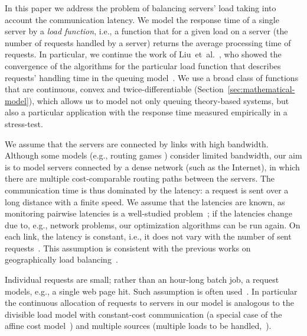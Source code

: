 \documentclass[11pt]{article}
\begin{document}
In this paper we address the problem of balancing servers' load taking into account the communication latency. 
We model the response time of a single server by a \emph{load function}, i.e., a function that for a given load on a server (the number of requests handled by a server) returns the average processing time of requests. In particular, we continue the work of Liu~et~al.~\cite{Liu:2011:GGL:1993744.1993767}, who showed the convergence of the algorithms for the particular load function that describes requests' handling time in the queuing model~\cite{Gross:2008:FQT:1972549}.
We use a broad class of functions that are continuous, convex and twice-differentiable (Section~\ref{sec:mathematical-model}), 
which allows us to model not only queuing theory-based systems,
but also a particular application with the response time measured empirically in a stress-test.

We assume that the servers are connected by links with high bandwidth. 
Although some models (e.g., routing games \cite{routingGames}) consider limited bandwidth, our aim is to model servers connected by a dense network (such as the Internet), in which there are multiple cost-comparable routing paths between the servers.
The communication time is thus dominated by the latency: 
a request is sent over a long distance with a finite speed. We assume that the latencies are known, as monitoring pairwise latencies is a well-studied problem~\cite{Szymaniak04scalablecooperative, Chan-TinH11}; if the latencies change due to, e.g., network problems, our optimization algorithms can be run again.
On each link, the latency is constant, i.e., it does not vary with the number of sent requests~\cite{Skowron:2013:NDL:2510648.2510769}. This assumption is consistent with the previous works on geographically load balancing~\cite{Liu:2011:GGL:1993744.1993767, Skowron:2013:NDL:2510648.2510769, Cardellini00geographicload, Penmatsa:2006:CLB:1898953.1899089, Grosu:2008:CLB:1455689.1455695, Aote:2009:GMD:1523103.1523153, Grosu:2002:AMD:792762.793282}.

Individual requests are small; rather than an hour-long batch job, a request models, e.g., a single web page hit. Such assumption is often used~\cite{Penmatsa:2006:CLB:1898953.1899089, Liu:2011:GGL:1993744.1993767, Skowron:2013:NDL:2510648.2510769, Grosu:2008:CLB:1455689.1455695, gallet09divisibleload, beaumont2005scheduling, veeravalli2002efficient, drozdowski2008scheduling}. In particular the continuous allocation of requests to servers in our model is analogous to the divisible load model with constant-cost communication (a special case of the affine cost model~\cite{beaumont2005scheduling}) and multiple sources (multiple loads to be handled,~\cite{veeravalli2002efficient, drozdowski2008scheduling}).
\end{document}
